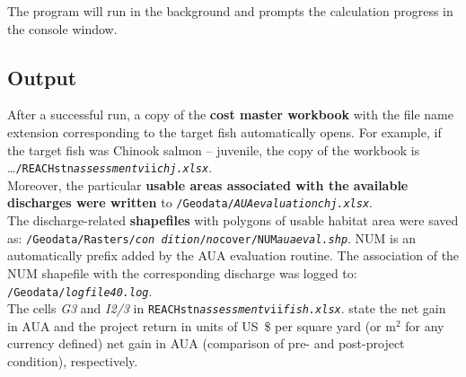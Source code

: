 The program will run in the background and prompts the calculation progress in the console window.

\subsection{Output}
After a successful run, a copy of the \textbf{cost master workbook} with the file name extension corresponding to the target fish automatically opens. For example, if the target fish was Chinook salmon -- juvenile, the copy of the workbook is \ldots{}\texttt{/REACH\emph{{\myUnderscore}}stn\emph{{\myUnderscore}assessment{\myUnderscore}v}ii\emph{{\myUnderscore}chj.xlsx}}.\\

Moreover, the particular \textbf{usable areas associated with the available discharges were written} to \texttt{/Geodata/\emph{AUA{\myUnderscore}evaluation{\myUnderscore}chj.xlsx}}.\\

The discharge-related \textbf{shapefiles} with polygons of usable habitat area were saved as: \texttt{/Geodata/Rasters/\emph{con dition}/\emph{no}{\myUnderscore}cover/NUM\emph{aua{\myUnderscore}eval.shp}}. NUM is an automatically prefix added by the AUA evaluation routine. The association of the NUM shapefile with the corresponding discharge was logged to: \texttt{/Geodata/\emph{logfile{\myUnderscore}40.log}}.\\

The cells \emph{G3} and \emph{I2/3} in \texttt{REACH\emph{{\myUnderscore}}stn\emph{{\myUnderscore}assessment{\myUnderscore}v}ii\emph{{\myUnderscore}fish.xlsx}}. state the
net gain in AUA and the project return in units of US~\$ per square yard (or m$^2$ for any currency defined) net gain in AUA (comparison of pre- and post-project condition), respectively.


 

